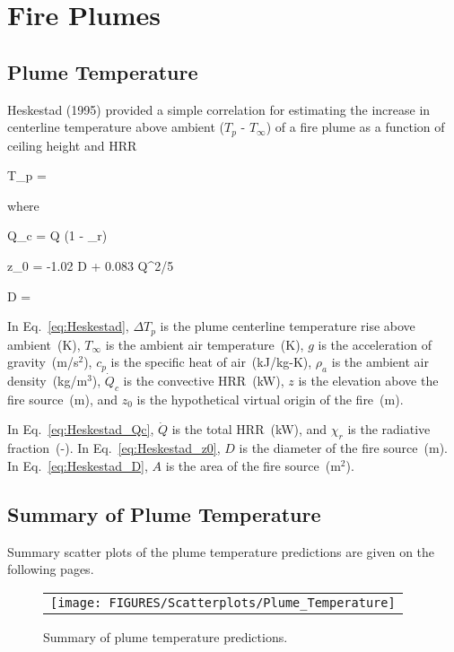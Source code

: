 \chapter{Fire Plumes}

\section{Plume Temperature}

Heskestad (1995) provided a simple correlation for estimating the increase in centerline temperature above ambient ($T_p$ - $T_\infty$) of a fire plume as a function of ceiling height and HRR

\be
\Delta T_p = 
\label{eq:Heskestad}
\ee

\noindent where

\be
\dot Q_c = \dot Q (1 - \chi_r)
\label{eq:Heskestad_Qc}
\ee

\be
z_0 = -1.02 D + 0.083 \dot Q^{2/5}
\label{eq:Heskestad_z0}
\ee

\be
D = 
\label{eq:Heskestad_D}
\ee

In Eq.~\ref{eq:Heskestad}, $\Delta T_p$ is the plume centerline temperature rise above ambient~(K), $T_\infty$ is the ambient air temperature~(K), $g$ is the acceleration of gravity~(m/s$^2$), $c_p$ is the specific heat of air~(kJ/kg-K), $\rho_{a}$ is the ambient air density~(kg/m$^3$), $\dot Q_c$ is the convective HRR~(kW), $z$ is the elevation above the fire source~(m), and $z_0$ is the hypothetical virtual origin of the fire~(m).

In Eq.~\ref{eq:Heskestad_Qc}, $\dot Q$ is the total HRR~(kW), and $\chi_r$ is the radiative fraction~(-). In Eq.~\ref{eq:Heskestad_z0}, $D$ is the diameter of the fire source~(m). In Eq.~\ref{eq:Heskestad_D}, $A$ is the area of the fire source~(m$^2$).

\clearpage

\section{Summary of Plume Temperature}

Summary scatter plots of the plume temperature predictions are given on the following pages.

\begin{figure}[ht]
\begin{center}
\begin{tabular}{l}
\texttt{[image: FIGURES/Scatterplots/Plume\_Temperature]}
\end{tabular}
\end{center}
\caption[Summary of plume temperature predictions.]
{Summary of plume temperature predictions.}
\label{Plume_Summary}
\end{figure}

